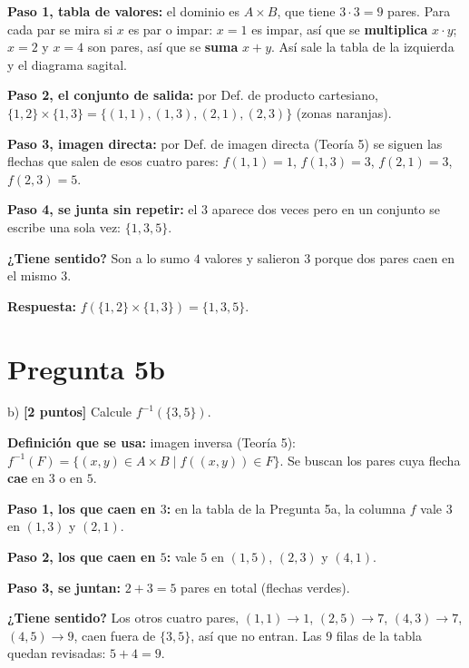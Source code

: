\documentclass[11pt]{article}
\newcommand{\hl}[1]{\colorbox{green!35}{#1}}
\begin{document}
\begin{explica}
\textbf{Paso 1, tabla de valores:} el dominio es $A\times B$, que tiene $3\cdot3=9$ pares. Para cada par se mira si $x$ es par o impar: $x=1$ es impar, así que se \textbf{multiplica} $x\cdot y$; $x=2$ y $x=4$ son pares, así que se \textbf{suma} $x+y$. Así sale la tabla de la izquierda y el diagrama sagital.

\textbf{Paso 2, el conjunto de salida:} por Def. de producto cartesiano, $\{1,2\}\times\{1,3\}=\{(1,1),(1,3),(2,1),(2,3)\}$ (zonas naranjas).

\textbf{Paso 3, imagen directa:} por Def. de imagen directa (Teoría 5) se siguen las flechas que salen de esos cuatro pares: $f(1,1)=1$, $f(1,3)=3$, $f(2,1)=3$, $f(2,3)=5$.

\textbf{Paso 4, se junta sin repetir:} el $3$ aparece dos veces pero en un conjunto se escribe una sola vez: $\{1,3,5\}$.

\textbf{¿Tiene sentido?} Son a lo sumo $4$ valores y salieron $3$ porque dos pares caen en el mismo $3$.
\end{explica}

\textbf{Respuesta:} $f(\{1,2\}\times\{1,3\})=\{1,3,5\}$.

\clearpage
\section*{Pregunta 5b}

b) \textbf{[2 puntos]} Calcule \hl{$f^{-1}(\{3,5\})$}.

\begin{center}
\end{center}


\begin{explica}
\textbf{Definición que se usa:} imagen inversa (Teoría 5): $f^{-1}(F)=\{(x,y)\in A\times B\mid f((x,y))\in F\}$. Se buscan los pares cuya flecha \textbf{cae} en $3$ o en $5$.

\textbf{Paso 1, los que caen en $3$:} en la tabla de la Pregunta 5a, la columna $f$ vale $3$ en $(1,3)$ y $(2,1)$.

\textbf{Paso 2, los que caen en $5$:} vale $5$ en $(1,5)$, $(2,3)$ y $(4,1)$.

\textbf{Paso 3, se juntan:} $2+3=5$ pares en total (flechas verdes).

\textbf{¿Tiene sentido?} Los otros cuatro pares, $(1,1)\to1$, $(2,5)\to7$, $(4,3)\to7$, $(4,5)\to9$, caen fuera de $\{3,5\}$, así que no entran. Las $9$ filas de la tabla quedan revisadas: $5+4=9$.
\end{explica}
\end{document}
